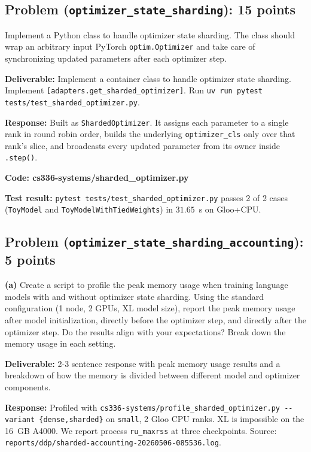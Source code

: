 \documentclass[11pt]{article}
\begin{document}
\subsection*{Problem (\texttt{optimizer\_state\_sharding}): 15 points}

Implement a Python class to handle optimizer state sharding. The class should wrap an arbitrary input PyTorch \texttt{optim.Optimizer} and take care of synchronizing updated parameters after each optimizer step.

\textbf{Deliverable:} Implement a container class to handle optimizer state sharding. Implement \texttt{[adapters.get\_sharded\_optimizer]}. Run \texttt{uv run pytest tests/test\_sharded\_optimizer.py}.

\vspace{0.25cm}
\textbf{Response:} Built as \texttt{ShardedOptimizer}. It assigns each parameter to a single rank in round robin order, builds the underlying \verb|optimizer_cls| only over that rank's slice, and broadcasts every updated parameter from its owner inside \verb|.step()|.

\textbf{Code: cs336-systems/sharded\_optimizer.py}

\textbf{Test result:} \verb|pytest tests/test_sharded_optimizer.py| passes 2 of 2 cases (\texttt{ToyModel} and \texttt{ToyModelWithTiedWeights}) in $31.65$~s on Gloo+CPU.

\subsection*{Problem (\texttt{optimizer\_state\_sharding\_accounting}): 5 points}

\textbf{(a)} Create a script to profile the peak memory usage when training language models with and without optimizer state sharding. Using the standard configuration (1 node, 2 GPUs, XL model size), report the peak memory usage after model initialization, directly before the optimizer step, and directly after the optimizer step. Do the results align with your expectations? Break down the memory usage in each setting.

\textbf{Deliverable:} 2-3 sentence response with peak memory usage results and a breakdown of how the memory is divided between different model and optimizer components.

\vspace{0.25cm}
\textbf{Response:}
Profiled with \verb|cs336-systems/profile_sharded_optimizer.py --variant {dense,sharded}| on \texttt{small}, 2 Gloo CPU ranks. XL is impossible on the 16~GB A4000. We report process \texttt{ru\_maxrss} at three checkpoints. Source: \verb|reports/ddp/sharded-accounting-20260506-085536.log|.
\end{document}
